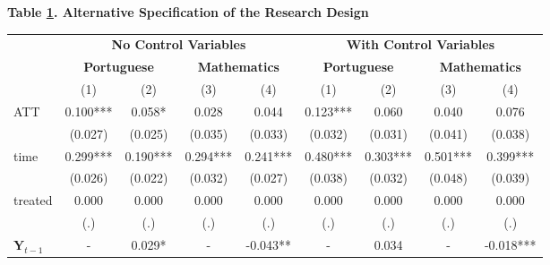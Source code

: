 \documentclass[a4paper, 12pt]{article}
\begin{document}
             \begin{table}[h]                                    \label{table:AlternativeSpecification}                        \centering            \textbf{Table \ref{table:AlternativeSpecification}. Alternative Specification of the Research Design} \\             
\begin{adjustbox}{max width=\textwidth}          
\begin{tabular}{@{\extracolsep{4pt}}l*{8}{c}@{}}             \toprule             & \multicolumn{4}{c}{\textbf{No Control Variables}} &            \multicolumn{4}{c}{\textbf{With Control Variables}} \\            \cline{2-5}              \cline{6-9}                    & \multicolumn{2}{c}{\textbf{Portuguese}} &                    \multicolumn{2}{c}{\textbf{Mathematics}} &                    \multicolumn{2}{c}{\textbf{Portuguese}} &            \multicolumn{2}{c}{\textbf{Mathematics}} \\            \cline{2-3}                    \cline{4-5}                    \cline{6-7}            \cline{8-9}          
                    &         (1)   &         (2)   &         (3)   &         (4)   &         (1)   &         (2)   &         (3)   &         (4)   \\
\hline
ATT                 &      0.100***   &      0.058*   &      0.028   &      0.044   &      0.123***   &   0.060      &   0.040      &        0.076 \\
                    &    (0.027)   &    (0.025)   &    (0.035)   &    (0.033)   &   (0.032)    &  (0.031)     &   (0.041)    &  (0.038)     \\
time                 &      0.299***   &      0.190***   &      0.294***   &      0.241***   &      0.480***   &   0.303***      &   0.501***      &        0.399*** \\
                    &    (0.026)   &    (0.022)   &    (0.032)   &    (0.027)   &   (0.038)    &  (0.032)     &   (0.048)    &  (0.039)     \\
treated                 &      0.000   &      0.000   &      0.000   &      0.000   &      0.000   &  0.000      &   0.000      &        0.000 \\
                    &    (.)   &    (.)   &    (.)   &    (.)   &   (.)    &  (.)     &   (.)    &  (.)     \\
$\mathbf{Y}_{t-1}$              &       -&       0.029*&              - &      -0.043**         &  -     &   0.034    &              - &      -0.018***         \\

\end{tabular}
\end{adjustbox}
\end{table}
\end{document}
